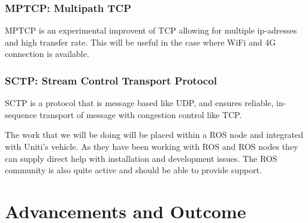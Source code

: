 \documentclass[a4paper]{article}
\begin{document}
\subsubsection*{MPTCP: Multipath TCP}
MPTCP is an experimental improvent of TCP allowing for multiple ip-adresses and
high transfer rate. This will be useful in the case where	WiFi and 4G connection
is available. \cite{spec_MPTCP}

\subsubsection*{SCTP: Stream Control Transport Protocol}
SCTP is a protocol that is message based like UDP, and ensures reliable,
in-sequence transport of message with congestion control like TCP.
\cite{spec_SCTP}

The work that we will be doing will be placed within a ROS node and integrated
with Uniti's vehicle. As they have been working with ROS and ROS nodes they can
supply direct help with installation and development issues. The ROS community
is also quite active and should be able to provide support.






\section{Advancements and Outcome}

\end{document}
